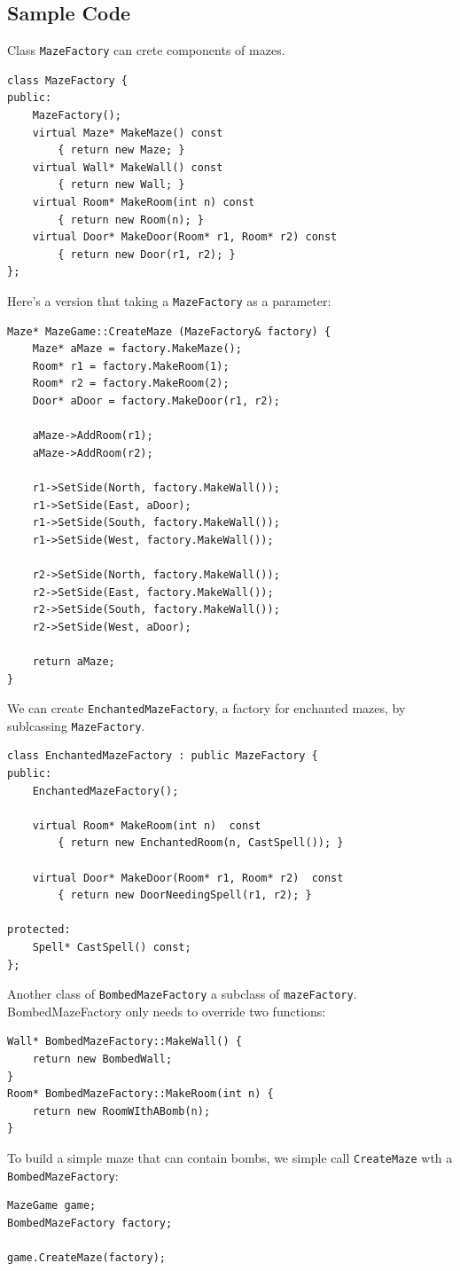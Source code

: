 \documentclass[11pt, a4paper]{book}
\begin{document}
\subsection{Sample Code}
Class \verb|MazeFactory| can crete components of mazes.
\begin{verbatim}
class MazeFactory {
public:
    MazeFactory();
    virtual Maze* MakeMaze() const
        { return new Maze; }
    virtual Wall* MakeWall() const
        { return new Wall; }
    virtual Room* MakeRoom(int n) const
        { return new Room(n); }
    virtual Door* MakeDoor(Room* r1, Room* r2) const
        { return new Door(r1, r2); }
};
\end{verbatim}
Here's a version that taking a \verb|MazeFactory| as a parameter:
\begin{verbatim}
Maze* MazeGame::CreateMaze (MazeFactory& factory) {
    Maze* aMaze = factory.MakeMaze();
    Room* r1 = factory.MakeRoom(1);
    Room* r2 = factory.MakeRoom(2);
    Door* aDoor = factory.MakeDoor(r1, r2);

    aMaze->AddRoom(r1);
    aMaze->AddRoom(r2);

    r1->SetSide(North, factory.MakeWall());
    r1->SetSide(East, aDoor);
    r1->SetSide(South, factory.MakeWall());
    r1->SetSide(West, factory.MakeWall());

    r2->SetSide(North, factory.MakeWall());
    r2->SetSide(East, factory.MakeWall());
    r2->SetSide(South, factory.MakeWall());
    r2->SetSide(West, aDoor);

    return aMaze;
}
\end{verbatim}
We can create \verb|EnchantedMazeFactory|, a factory for enchanted mazes, by
sublcassing \verb|MazeFactory|.
\begin{verbatim}
class EnchantedMazeFactory : public MazeFactory {
public:
    EnchantedMazeFactory();

    virtual Room* MakeRoom(int n)  const
        { return new EnchantedRoom(n, CastSpell()); }

    virtual Door* MakeDoor(Room* r1, Room* r2)  const
        { return new DoorNeedingSpell(r1, r2); }

protected:
    Spell* CastSpell() const;
};
\end{verbatim}

Another class of \verb|BombedMazeFactory| a subclass of \verb|mazeFactory|.
BombedMazeFactory only needs to override two functions:
\begin{verbatim}
Wall* BombedMazeFactory::MakeWall() {
    return new BombedWall;
}
Room* BombedMazeFactory::MakeRoom(int n) {
    return new RoomWIthABomb(n);
}
\end{verbatim}
To build a simple maze that can contain bombs, we simple call \verb|CreateMaze|
wth a \verb|BombedMazeFactory|:
\begin{verbatim}
MazeGame game;
BombedMazeFactory factory;

game.CreateMaze(factory);
\end{verbatim}
\end{document}
